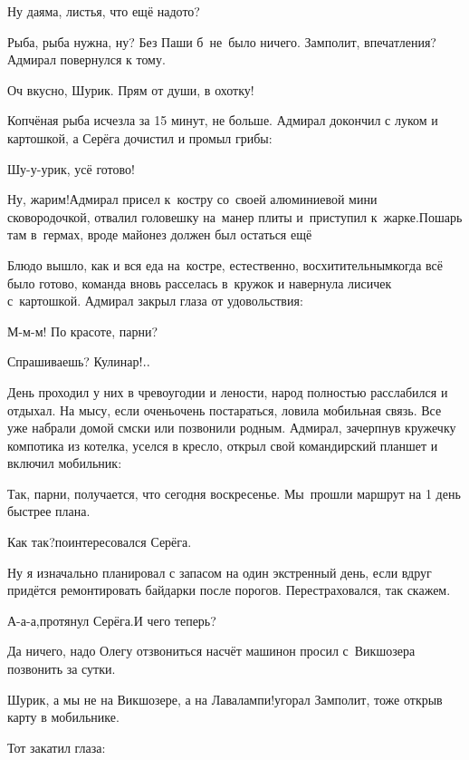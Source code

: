 \diagdash Ну да\mdash яма, листья, что ещё надо\sdash то?

\diagdash Рыба, рыба нужна, ну? Без Паши б~не~было ничего. Замполит, впечатления?\mdash Адмирал повернулся к тому.

\diagdash Оч вкусно, Шурик. Прям от души, в охотку!

Копчёная рыба исчезла за 15 минут, не больше. Адмирал докончил с луком и картошкой, а Серёга дочистил и промыл грибы:

\diagdash Шу-у-урик, усё готово! 

\diagdash Ну, жарим!\mdash Адмирал присел к~костру со~своей алюминиевой мини сковородочкой, отвалил головешку на~манер плиты и~приступил к~жарке.\mdash Пошарь там в~гермах, вроде майонез должен был остаться ещё\myldots{} %

Блюдо вышло, как и вся еда на~костре, естественно, восхитительным\mdash когда всё было готово, команда вновь расселась в~кружок и навернула лисичек с~картошкой. Адмирал закрыл глаза от удовольствия:

\diagdash М-м-м! По красоте, парни?

\diagdash Спрашиваешь? Кулинар$\exldots$%

\vspace{0.4cm}
\myldots{}День проходил у них в чревоугодии и лености, народ полностью расслабился и отдыхал. На мысу, если очень\sdash очень  постараться, ловила мобильная связь. Все уже набрали домой смс\sdash ки или позвонили родным. Адмирал, зачерпнув кружечку компотика из котелка, уселся в кресло, открыл свой командирский планшет и включил мобильник:

\diagdash Так, парни, получается, что сегодня воскресенье. Мы~прошли маршрут на 1 день быстрее плана.

\diagdash Как так?\mdash поинтересовался Серёга.

\diagdash Ну я изначально планировал с запасом на один экстренный день, если вдруг придётся ремонтировать байдарки после порогов. Перестраховался, так скажем.

\diagdash А-а-а,\mdash протянул Серёга.\mdash И чего теперь?

\diagdash Да ничего, надо Олегу отзвониться насчёт машин\mdash он просил с~Викшозера позвонить за сутки.

\diagdash Шурик, а мы не на Викшозере, а на Лавалампи!\mdash угорал Замполит, тоже открыв карту в мобильнике.

Тот закатил глаза:


